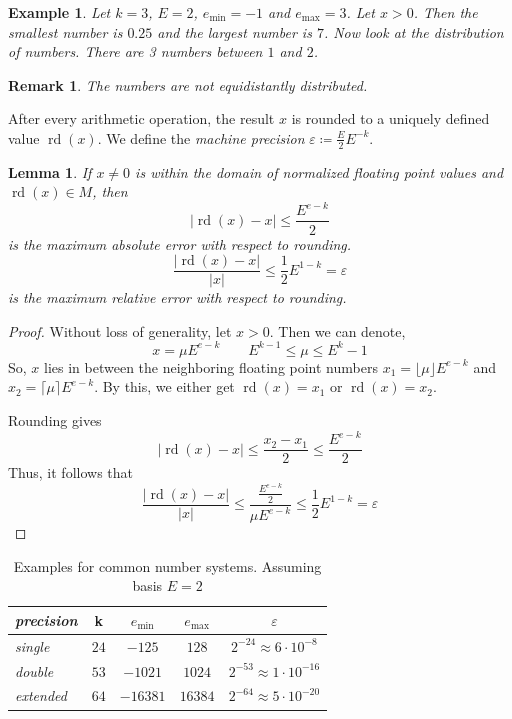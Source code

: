 \documentclass[a4paper]{article}
\newcounter{lecref}[section]
\numberwithin{lecref}{section}
\theoremstyle{break}
\newtheorem{example}[lecref]{Example}
\newtheorem{lemma}[lecref]{Lemma}
\newtheorem*{Remark}{Remark}
\newcommand{\Abs}[1]{\left|#1\right|}
\begin{document}
\begin{example}
  \label{example-2-2}
  Let $k = 3$, $E = 2$, $e_{\min} = -1$ and $e_{\max} = 3$.
  Let $x > 0$.
  Then the smallest number is $0.25$ and the largest number is $7$.
  Now look at the distribution of numbers. There are 3 numbers between $1$ and $2$.
\end{example}
\begin{Remark}
  The numbers are not equidistantly distributed.
\end{Remark}

After every arithmetic operation, the result $x$ is rounded to a uniquely defined value $\operatorname{rd}(x)$.
We define the \emph{machine precision} $\varepsilon \coloneqq \frac{E}{2} E^{-k}$.

\begin{lemma}
  \label{example:2-3}
  If $x \neq 0$ is within the domain of normalized floating point values and $\operatorname{rd}(x) \in M$, then
  \[ \Abs{\operatorname{rd}(x) - x} \leq \frac{E^{e-k}}{2} \]
  is the \emph{maximum absolute error} with respect to rounding.
  \[ \frac{\Abs{\operatorname{rd}(x) - x}}{\Abs{x}} \leq \frac12 E^{1 - k} = \varepsilon \]
  is the \emph{maximum relative error} with respect to rounding.
\end{lemma}

\begin{proof}
  Without loss of generality, let $x > 0$. Then we can denote,
  \[ x = \mu E^{e-k} \qquad E^{k-1} \leq \mu \leq E^k - 1  \]
  So, $x$ lies in between the neighboring floating point numbers $x_1 = \lfloor \mu \rfloor E^{e - k}$ and $x_2 = \lceil \mu \rceil E^{e-k}$.
  By this, we either get $\operatorname{rd}(x) = x_1$ or $\operatorname{rd}(x) = x_2$.

  Rounding gives
  \[ \Abs{\operatorname{rd}(x) - x} \leq \frac{x_2 - x_1}{2} \leq \frac{E^{e-k}}{2} \]
  Thus, it follows that
  \[ \frac{\Abs{\operatorname{rd}(x) - x}}{\Abs{x}} \leq \frac{\frac{E^{e-k}}{2}}{\mu E^{e-k}} \leq \frac12 E^{1-k} = \varepsilon \]
\end{proof}

\begin{table}[!ht]
  \begin{center}
    \begin{tabular}{lcccc}
      \emph{precision} & k    & $e_{\min}$ & $e_{\max}$ & $\varepsilon$ \\
    \hline
      \emph{single}    & $24$ & $-125$     & $128$      & $2^{-24} \approx 6 \cdot 10^{-8}$ \\
      \emph{double}    & $53$ & $-1021$    & $1024$     & $2^{-53} \approx 1 \cdot 10^{-16}$ \\
      \emph{extended}  & $64$ & $-16381$   & $16384$    & $2^{-64} \approx 5 \cdot 10^{-20}$
    \end{tabular}
    \caption{Examples for common number systems. Assuming basis $E = 2$}
  \end{center}
\end{table}
\end{document}
